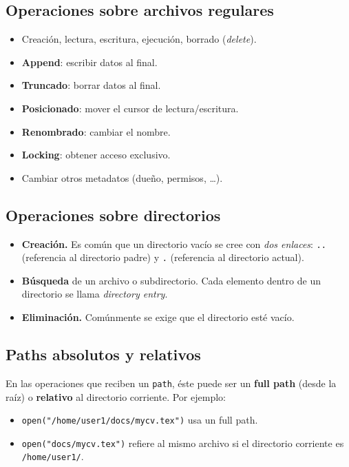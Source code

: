 \documentclass[11pt,a4paper]{article}
\begin{document}
\subsection{Operaciones sobre archivos regulares}

\begin{itemize}[leftmargin=*,nosep]
    \item Creación, lectura, escritura, ejecución, borrado
        (\emph{delete}).
    \item \textbf{Append}: escribir datos al final.
    \item \textbf{Truncado}: borrar datos al final.
    \item \textbf{Posicionado}: mover el cursor de lectura/escritura.
    \item \textbf{Renombrado}: cambiar el nombre.
    \item \textbf{Locking}: obtener acceso exclusivo.
    \item Cambiar otros metadatos (dueño, permisos, \ldots).
\end{itemize}

\subsection{Operaciones sobre directorios}

\begin{itemize}[leftmargin=*]
    \item \textbf{Creación.} Es común que un directorio vacío se cree
        con \emph{dos enlaces}: \verb|..| (referencia al directorio
        padre) y \verb|.| (referencia al directorio actual).
    \item \textbf{Búsqueda} de un archivo o subdirectorio. Cada
        elemento dentro de un directorio se llama \emph{directory
        entry}.
    \item \textbf{Eliminación.} Comúnmente se exige que el directorio
        esté vacío.
\end{itemize}

\subsection{Paths absolutos y relativos}

En las operaciones que reciben un \texttt{path}, éste puede ser un
\textbf{full path} (desde la raíz) o \textbf{relativo} al directorio
corriente. Por ejemplo:

\begin{itemize}[leftmargin=*,nosep]
    \item \verb|open("/home/user1/docs/mycv.tex")| usa un full path.
    \item \verb|open("docs/mycv.tex")| refiere al mismo archivo si el
        directorio corriente es \verb|/home/user1/|.
\end{itemize}
\end{document}
